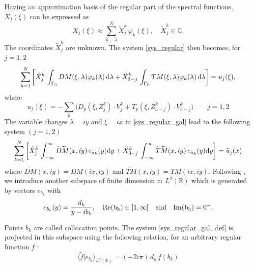 Having an approximation basis of the regular part of the spectral functions, $X_j(\xi)$ can be expressed as
\begin{equation}
\label{regular_part_decomp}
X_j(\xi) \approx \sum_{k=1}^N \tilde{X}_j^k \, \varphi_k(\xi), \quad \tilde{X}_j^k \in \mathbb{C}.
\end{equation}
The coordinates $\tilde{X}_j^k$ are unknown. The system \eqref{sys_regular} then becomes, for $j=1,2$
\begin{equation}
\label{sys_regular_gal}
\sum_{k=1}^N \left[ \tilde{X}_j^k \, \int_{\Gamma_0} DM(\xi,\lambda) \varphi_k(\lambda) \, {\rm d} \lambda + \tilde{X}_{3-j}^k \, \int_{\Gamma_0} TM(\xi,\lambda) \varphi_k(\lambda) \, {\rm d} \lambda \right] = u_j(\xi), 
\end{equation}
where
\begin{equation}
\label{second_member}
u_j(\xi) = -\sum_k \Big( D_p(\xi,Z_j^k)\cdot V_j^k+ T_p(\xi,Z_{3-j}^k)\cdot V_{3-j}^k\Big) \qquad j=1,2
\end{equation}
The variable changes $\lambda = iy$ and $\xi = ix$ in \eqref{sys_regular_gal} lead to the following system $(j=1,2)$
\begin{equation}
\label{sys_regular_gal_def}
\sum_{k=1}^N \left[ \tilde{X}_j^k \, \int_{-\infty}^\infty  \widetilde{DM}(x,iy) \, e_{a_k}(y) {\rm d} y + \tilde{X}_{3-j}^k \, \int_{-\infty}^\infty  \widetilde{TM}(x,iy) \, e_{a_k}(y) {\rm d} y \right] = \tilde u_j(x) \\
\end{equation}
where $\widetilde{DM}(x,iy) = DM(ix,iy)$ and $\widetilde{TM}(x,iy) = TM(ix,iy)$. Following \cite{CroisilleLebeau}, we introduce another subspace of finite dimension in $L^2(\mathbb{R})$ which is generated by vectors $e_{b_k}$ with
\begin{equation}
\label{points_collocation}
e_{b_k}(y)=\frac{d_k}{y-ib_k}, \quad  \rm Re (b_k) \in [1,\infty[  \quad \text{and}  \quad {\rm Im} (b_k) = 0^-.
\end{equation}

Points $b_k$ are called collocation points.  The system \eqref{sys_regular_gal_def} is projected in this subspace using the following relation, for an arbitrary regular function $f$ :
\begin{equation}
\label{dot_product}
\langle \tilde f\vert e_{b_k}\rangle_{L^2(\mathbb R)}= (-2i\pi) \, d_k \,  f (b_k)
\end{equation}


